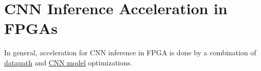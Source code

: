 

\section{CNN Inference Acceleration in FPGAs}
\label{sec:CNN_inference_acceleration}
In general, acceleration for CNN inference in FPGA is done by a combination of \underline{datapath} and \underline{CNN model} optimizations.

